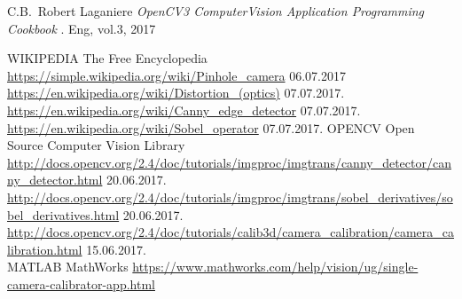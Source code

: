 \documentclass[journal,final,a4paper,twoside]{PS}
\begin{document}
\begin{thebibliography}{1}
C.B.~Robert Laganiere  \emph{OpenCV3 ComputerVision Application Programming Cookbook }. Eng, vol.3, 2017

WIKIPEDIA {The Free Encyclopedia}
\url{https://simple.wikipedia.org/wiki/Pinhole_camera} 06.07.2017\\
\url {https://en.wikipedia.org/wiki/Distortion_(optics)} 07.07.2017.\\
\url {https://en.wikipedia.org/wiki/Canny_edge_detector} 07.07.2017.\\
\url {https://en.wikipedia.org/wiki/Sobel_operator} 07.07.2017.
OPENCV {Open Source Computer Vision Library}
\url {http://docs.opencv.org/2.4/doc/tutorials/imgproc/imgtrans/canny_detector/canny_detector.html} 20.06.2017.\\
\url {http://docs.opencv.org/2.4/doc/tutorials/imgproc/imgtrans/sobel_derivatives/sobel_derivatives.html} 20.06.2017.\\
\url {http://docs.opencv.org/2.4/doc/tutorials/calib3d/camera_calibration/camera_calibration.html} 15.06.2017.\\
MATLAB {MathWorks}
\url {https://www.mathworks.com/help/vision/ug/single-camera-calibrator-app.html}
\end{thebibliography}
\end{document}
